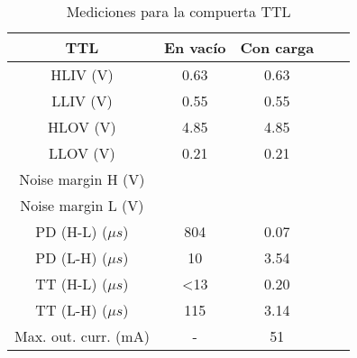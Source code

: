 \documentclass[../../e3_tp2_main.tex]{subfiles}
\begin{document}
\begin{table}[H]
	\centering
	\begin{tabular}{|c|c|c|c|c|}
	\hline
        TTL                          	& En vac\'io	& Con carga \\ \hline \hline
	HLIV (V)                   	& 0.63             	& 0.63                       \\ \hline
	LLIV (V)                    	& 0.55             	& 0.55                      \\ \hline
	HLOV (V)                  	& 4.85             	& 4.85                \\ \hline
	LLOV (V)                   	& 0.21             	& 0.21                        \\ \hline
	Noise margin H (V)    	&                      &                                \\ \hline
	Noise margin L (V)	&			&				\\ \hline
	PD (H-L) ($\mu s$)	& 804               	& 0.07                  \\ \hline
	PD (L-H) ($\mu s$) 	& 10               	& 3.54                   \\ \hline
	TT (H-L) ($\mu s$)   	& <13               & 0.20              \\ \hline
	TT (L-H) ($\mu s$)   	& 115               	& 3.14                    \\ \hline
	Max. out. curr. (mA)   & -                  	& 51               \\ \hline

	\end{tabular}
	
	\caption{Mediciones para la compuerta TTL}
	\label{table:1-mediciones-ttl}
\end{table}
\end{document}
